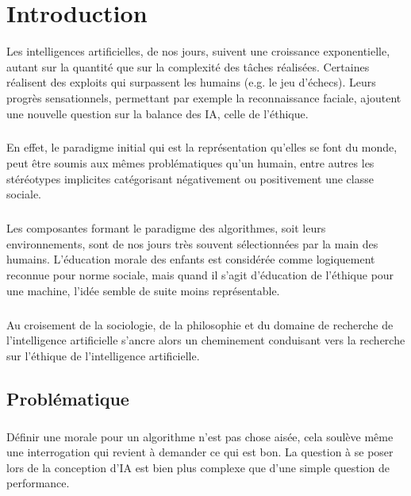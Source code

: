 \documentclass[10pt, french, a4paper]{report}
\begin{document}

\newpage
\chapter*{Introduction}

Les intelligences artificielles, de nos jours, suivent une croissance exponentielle, autant sur la quantité que sur la complexité des tâches réalisées. Certaines réalisent des exploits qui surpassent les humains (e.g. le jeu d’échecs). Leurs progrès sensationnels, permettant par exemple la reconnaissance faciale, ajoutent une nouvelle question sur la balance des IA, celle de l’éthique.

\paragraph{}
En effet, le paradigme initial qui est la représentation qu’elles se font du monde, peut être soumis aux mêmes problématiques qu’un humain, entre autres les stéréotypes implicites catégorisant négativement ou positivement une classe sociale.

\paragraph{}
Les composantes formant le paradigme des algorithmes, soit leurs environnements, sont de nos jours très souvent sélectionnées par la main des humains. L’éducation morale des enfants est considérée comme logiquement reconnue pour norme sociale, mais quand il s’agit d’éducation de l’éthique pour une machine, l’idée semble de suite moins représentable.

\paragraph{}
Au croisement de la sociologie, de la philosophie et du domaine de recherche de l’intelligence artificielle s’ancre alors un cheminement conduisant vers la recherche sur l’éthique de l’intelligence artificielle.


\section*{Problématique} 

\paragraph{}
Définir une morale pour un algorithme n’est pas chose aisée, cela soulève même une interrogation qui revient à demander ce qui est bon. La question à se poser lors de la conception d’IA est bien plus complexe que d’une simple question de performance.
\end{document}
